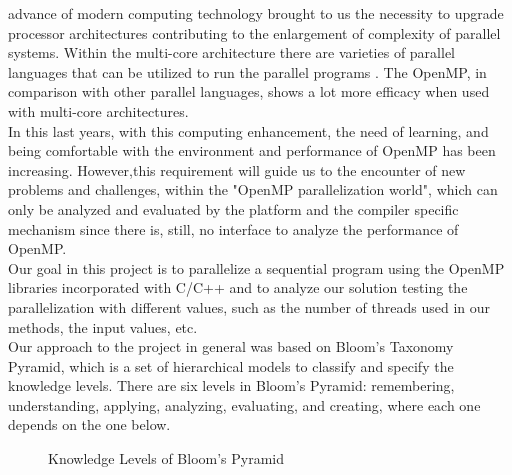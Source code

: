 \documentclass[10pt,journal,compsoc]{IEEEtran}
\begin{document}
\maketitle

\IEEEdisplaynontitleabstractindextext

\IEEEpeerreviewmaketitle



 advance of modern computing technology brought to us the necessity to upgrade processor architectures contributing to the enlargement of complexity of parallel systems. Within the multi-core architecture there are varieties of parallel languages that can be utilized to run the parallel programs \cite{surveyTools}. The OpenMP, in comparison with other parallel languages, shows a lot more efficacy when used with multi-core architectures.\\
In this last years, with this computing enhancement, the need of learning, and being comfortable with the environment and performance of OpenMP has been increasing. However,this requirement will guide us to the encounter of new problems and challenges, within the "OpenMP parallelization world", which can only be analyzed and evaluated by the platform and the compiler specific mechanism \cite{surveyTools} since there is, still, no interface to analyze the performance of OpenMP.\\
Our goal in this project is to parallelize a sequential program using the OpenMP libraries incorporated with C/C++ and to analyze our solution testing the parallelization with different values, such as the number of threads used in our methods, the input values, etc.\\
Our approach to the project in general was based on Bloom's Taxonomy Pyramid, which is a set of hierarchical models to classify and specify the knowledge levels. There are six levels in Bloom's Pyramid: remembering, understanding, applying, analyzing, evaluating, and creating, where each one depends on the one below.\\

\begin{center}
    \begin{figure}[htbp]
        \caption{Knowledge Levels of Bloom's Pyramid}
        \centering{\label{fig}}
    \end{figure}
\end{center}
\end{document}
